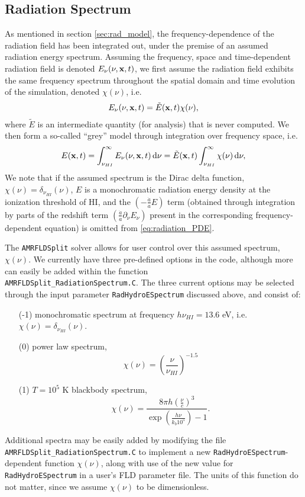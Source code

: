 \documentclass[letterpaper,10pt]{article}
\renewcommand{\(}{\left(}
\renewcommand{\)}{\right)}
\newcommand{\xvec}{{\bf x}}
\begin{document}
\subsection{Radiation Spectrum}
\label{sec:AMRFLDSplit_spectrum}

As mentioned in section \ref{sec:rad_model}, the frequency-dependence
of the radiation field has been integrated out, under the premise of
an assumed radiation energy spectrum.  Assuming the frequency, space
and time-dependent radiation field is denoted $E_{\nu}(\nu,\xvec,t)$,
we first assume the radiation field exhibits the same frequency
spectrum throughout the spatial domain and time evolution of the
simulation, denoted $\chi(\nu)$, i.e.
\begin{align}
  \label{eq:spectrum}
  E_{\nu}(\nu,\xvec,t) = \tilde{E}(\xvec,t) \chi(\nu),
\end{align}
where $\tilde{E}$ is an intermediate quantity (for analysis) that is
never computed.  We then form a so-called ``grey'' model through
integration over frequency space, i.e.
\begin{align}
  \label{eq:greyFLD}
  E(\xvec,t) = \int_{\nu_{HI}}^{\infty} E_{\nu}(\nu,\xvec,t)\,\mathrm{d}\nu 
    = \tilde{E}(\xvec,t) \int_{\nu_{HI}}^{\infty} \chi(\nu)\,\mathrm{d}\nu,
\end{align}
We note that if the assumed spectrum is the Dirac delta function,
$\chi(\nu) = \delta_{\nu_{HI}}(\nu)$, $E$ is a monochromatic radiation
energy density at the ionization threshold of HI, and the
$\left(-\frac{\dot{a}}{a}E\right)$ term (obtained through integration
by parts of the redshift term
$\left(\frac{\dot{a}}{a}\partial_{\nu}E_{\nu}\right)$ present in the
corresponding frequency-dependent equation) is omitted from
\eqref{eq:radiation_PDE}.

The {\tt AMRFLDSplit} solver allows for user control over this assumed
spectrum, $\chi(\nu)$.  We currently have three pre-defined options in
the code, although more can easily be added within the function \\
{\tt AMRFLDSplit\_RadiationSpectrum.C}.  The three current options may
be selected through the input parameter {\tt RadHydroESpectrum}
discussed above, and consist of:
\begin{itemize}
\item[(-1)] monochromatic spectrum at frequency $h\nu_{HI} = 13.6$ eV, i.e.
  $\chi(\nu) = \delta_{\nu_{HI}}(\nu)$.  
\item[(0)] power law spectrum,
  \[
  \chi(\nu) = \left(\frac{\nu}{\nu_{HI}}\right)^{-1.5}
  \]
\item[(1)] $T=10^5$ K blackbody spectrum, 
  \[
  \chi(\nu) = \frac{8 \pi h
    \left(\frac{\nu}{c}\right)^3}{\exp\left(\frac{h\nu}{k_b 10^5}\right)-1}.
  \]
\end{itemize}
Additional spectra may be easily added by modifying the file 
{\tt AMRFLDSplit\_RadiationSpectrum.C} to implement a new 
{\tt RadHydroESpectrum}-dependent function $\chi(\nu)$, along with use
of the new value for {\tt RadHydroESpectrum} in a user's FLD parameter
file.  The units of this function do not matter, since we assume
$\chi(\nu)$ to be dimensionless.
\end{document}
